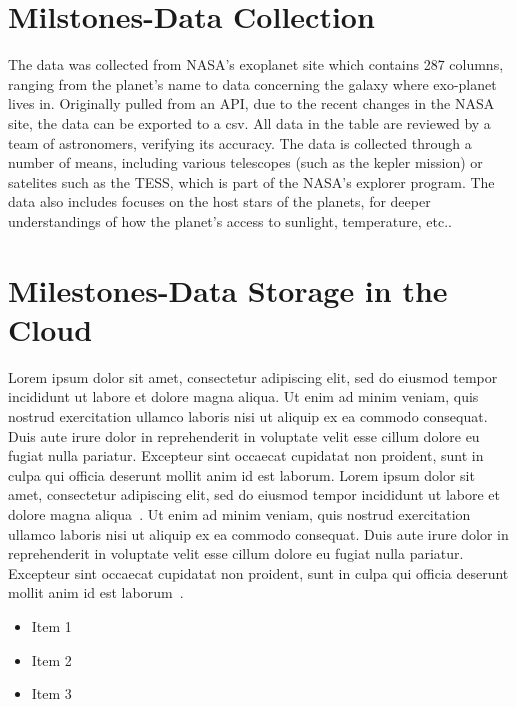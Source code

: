 \documentclass[letterpaper, 10 pt, conference]{ieeeconf}  %
\begin{document}
\section{Milstones-Data Collection}

The data was collected from NASA's exoplanet site which contains 287 columns, ranging from the planet's name to data concerning the galaxy where exo-planet lives in. Originally pulled from an API, due to the recent changes in the NASA site, the data can be exported to a csv. All data in the table are reviewed by a team of astronomers, verifying its accuracy. The data is collected through a number of means, including various telescopes (such as the kepler mission) or satelites such as the TESS, which is part of the NASA's explorer program. The data also includes focuses on the host stars of the planets, for deeper understandings of how the planet's access to sunlight, temperature, etc.. 

\section{Milestones-Data Storage in the Cloud}

Lorem ipsum dolor sit amet, consectetur adipiscing elit, sed do eiusmod tempor incididunt ut labore et dolore magna aliqua. Ut enim ad minim veniam, quis nostrud exercitation ullamco laboris nisi ut aliquip ex ea commodo consequat. Duis aute irure dolor in reprehenderit in voluptate velit esse cillum dolore eu fugiat nulla pariatur. Excepteur sint occaecat cupidatat non proident, sunt in culpa qui officia deserunt mollit anim id est laborum. Lorem ipsum dolor sit amet, consectetur adipiscing elit, sed do eiusmod tempor incididunt ut labore et dolore magna aliqua~\cite{Cite7}. Ut enim ad minim veniam, quis nostrud exercitation ullamco laboris nisi ut aliquip ex ea commodo consequat. Duis aute irure dolor in reprehenderit in voluptate velit esse cillum dolore eu fugiat nulla pariatur. Excepteur sint occaecat cupidatat non proident, sunt in culpa qui officia deserunt mollit anim id est laborum~\cite{Cite8}.

\begin{itemize}
	\item Item 1
	\item Item 2
	\item Item 3
\end{itemize}
\end{document}
